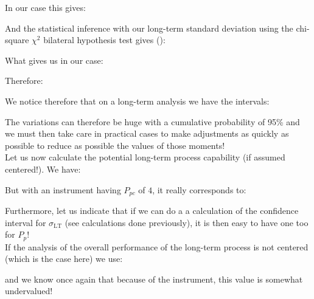 	\pagebreak
	\begin{tcolorbox}[colframe=black,colback=white,sharp corners]
	In our case this gives:
	
	And the statistical inference with our long-term standard deviation using the chi-square $\chi^2$ bilateral hypothesis test gives ():
	
	What gives us in our case:
	
	Therefore:
	
	We notice therefore that on a long-term analysis we have the intervals:
	
	The variations can therefore be huge with a cumulative probability of 95\% and we must then take care in practical cases to make adjustments as quickly as possible to reduce as possible the values of those moments!\\
	
	Let us now calculate the potential long-term process capability (if assumed centered!). We have:
	
	But with an instrument having $P_{pc}$ of $4$, it really corresponds to:
	
	Furthermore, let us indicate that if we can do a a calculation of the confidence interval for $\sigma_{\text{LT}}$ (see calculations done previously), it is then easy to have one too for $P_p$!\\
	If the analysis of the overall performance of the long-term process is not centered (which is the case here)  we use:
		
	and we know once again that because of the instrument, this value is somewhat undervalued!
	\end{tcolorbox}
	
